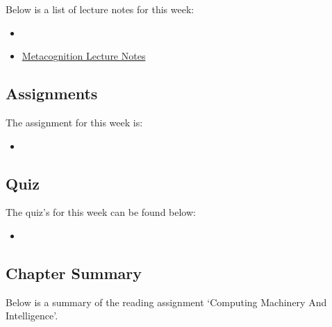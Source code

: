 \noindent Below is a list of lecture notes for this week:

\begin{itemize}
    \item {}
    \item \href{https://www.ldatschool.ca/metacognitive-strategies-or-thinking-about-my-thinking/}{Metacognition Lecture Notes}
\end{itemize}

\subsection{Assignments}

The assignment for this week is:

\begin{itemize}
    \item {}
\end{itemize}

\subsection{Quiz}

The quiz's for this week can be found below:

\begin{itemize}
    \item {}
\end{itemize}

\newpage

\subsection{Chapter Summary}

Below is a summary of the reading assignment `Computing Machinery And Intelligence'.

